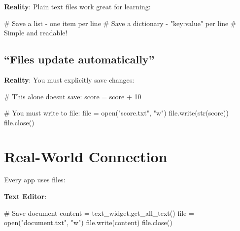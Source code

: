 \documentclass[
  letterpaper,
  DIV=11,
  numbers=noendperiod,
  oneside]{scrreprt}
\newenvironment{Shaded}{}{}
\newcommand{\BuiltInTok}[1]{\textcolor[rgb]{0.84,0.23,0.29}{#1}}
\newcommand{\CommentTok}[1]{\textcolor[rgb]{0.42,0.45,0.49}{#1}}
\newcommand{\DecValTok}[1]{\textcolor[rgb]{0.00,0.36,0.77}{#1}}
\newcommand{\NormalTok}[1]{\textcolor[rgb]{0.14,0.16,0.18}{#1}}
\newcommand{\OperatorTok}[1]{\textcolor[rgb]{0.14,0.16,0.18}{#1}}
\newcommand{\StringTok}[1]{\textcolor[rgb]{0.01,0.18,0.38}{#1}}
\begin{document}
\textbf{Reality}: Plain text files work great for learning:

\begin{Shaded}
\begin{Highlighting}[]
\CommentTok{\# Save a list {-} one item per line}
\CommentTok{\# Save a dictionary {-} "key:value" per line}
\CommentTok{\# Simple and readable!}
\end{Highlighting}
\end{Shaded}

\subsection{``Files update
automatically''}\label{files-update-automatically}

\textbf{Reality}: You must explicitly save changes:

\begin{Shaded}
\begin{Highlighting}[]
\CommentTok{\# This alone doesn\textquotesingle{}t save:}
\NormalTok{score }\OperatorTok{=}\NormalTok{ score }\OperatorTok{+} \DecValTok{10}

\CommentTok{\# You must write to file:}
\BuiltInTok{file} \OperatorTok{=} \BuiltInTok{open}\NormalTok{(}\StringTok{"score.txt"}\NormalTok{, }\StringTok{"w"}\NormalTok{)}
\BuiltInTok{file}\NormalTok{.write(}\BuiltInTok{str}\NormalTok{(score))}
\BuiltInTok{file}\NormalTok{.close()}
\end{Highlighting}
\end{Shaded}

\section{Real-World Connection}\label{real-world-connection-7}

Every app uses files:

\textbf{Text Editor}:

\begin{Shaded}
\begin{Highlighting}[]
\CommentTok{\# Save document}
\NormalTok{content }\OperatorTok{=}\NormalTok{ text\_widget.get\_all\_text()}
\BuiltInTok{file} \OperatorTok{=} \BuiltInTok{open}\NormalTok{(}\StringTok{"document.txt"}\NormalTok{, }\StringTok{"w"}\NormalTok{)}
\BuiltInTok{file}\NormalTok{.write(content)}
\BuiltInTok{file}\NormalTok{.close()}
\end{Highlighting}
\end{Shaded}
\end{document}
